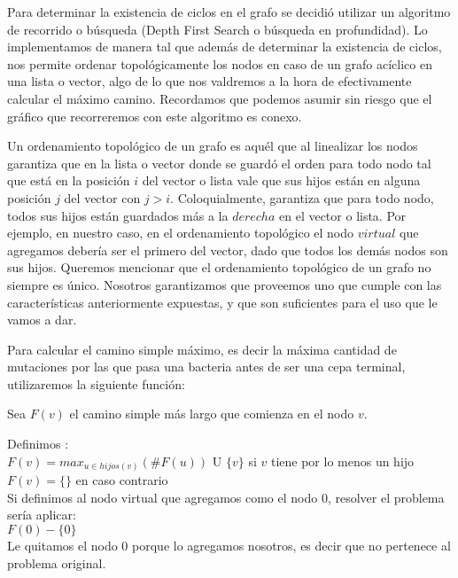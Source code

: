 \quad Para determinar la existencia de ciclos en el grafo se decidió utilizar un algoritmo de recorrido o búsqueda  (Depth First Search o búsqueda en profundidad). Lo implementamos de manera tal que además de determinar la existencia de ciclos, nos permite ordenar topológicamente los nodos en caso de un grafo acíclico en una lista o vector, algo de lo que nos valdremos a la hora de efectivamente calcular el máximo camino. Recordamos que podemos asumir sin riesgo que el gráfico que recorreremos con este algoritmo es conexo.

\quad Un ordenamiento topológico de un grafo es aquél que al linealizar los nodos garantiza que en la lista o vector donde se guardó el orden para todo nodo tal que está en la posición $i$ del vector o lista vale que sus hijos están en alguna posición $j$ del vector con $j>i$. Coloquialmente, garantiza que para todo nodo, todos sus hijos están guardados más a la $derecha$ en el vector o lista. Por ejemplo, en nuestro caso, en el ordenamiento topológico el nodo $virtual$ que agregamos debería ser el primero del vector, dado que todos los demás nodos son sus hijos. Queremos mencionar que el ordenamiento topológico de un grafo no siempre es único. Nosotros garantizamos que proveemos uno que cumple con las características anteriormente expuestas, y que son suficientes para el uso que le vamos a dar.


\quad Para calcular el camino simple máximo, es decir la máxima cantidad de mutaciones por las que pasa una bacteria antes de ser una cepa terminal, utilizaremos la siguiente función:

\quad Sea $F(v)$ el camino simple más largo que comienza en el nodo $v$.

\quad Definimos :\\	

\indent $F(v)= max_{u \in hijos(v)} (\#F(u))$ U $\{v\}$  \indent \indent si $v$ tiene por lo menos un hijo\\
\indent  $F(v)=\{\}$ \indent \indent \indent \indent \indent \indent \indent \indent  en caso contrario\\

\indent  Si definimos al nodo virtual que agregamos como el nodo 0, resolver el problema sería aplicar:\\

\indent $F(0) - \{0\}$\\

\indent Le quitamos el nodo 0 porque lo agregamos nosotros, es decir que no pertenece al problema original.\\

